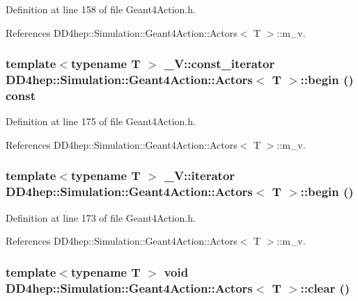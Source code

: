 Definition at line 158 of file Geant4Action.h.

References DD4hep::Simulation::Geant4Action::Actors$<$ T $>$::m\_\-v.\hypertarget{class_d_d4hep_1_1_simulation_1_1_geant4_action_1_1_actors_a6a4ddb5b54c6676c1f4856d331638a1d}{
\subsubsection[{begin}]{\setlength{\rightskip}{0pt plus 5cm}template$<$typename T $>$ \_\-V::const\_\-iterator {\bf DD4hep::Simulation::Geant4Action::Actors}$<$ {\bf T} $>$::begin () const}}
\label{class_d_d4hep_1_1_simulation_1_1_geant4_action_1_1_actors_a6a4ddb5b54c6676c1f4856d331638a1d}


Definition at line 175 of file Geant4Action.h.

References DD4hep::Simulation::Geant4Action::Actors$<$ T $>$::m\_\-v.\hypertarget{class_d_d4hep_1_1_simulation_1_1_geant4_action_1_1_actors_a400f8d564251e0bba5cdb1e35f58b72a}{
\subsubsection[{begin}]{\setlength{\rightskip}{0pt plus 5cm}template$<$typename T $>$ \_\-V::iterator {\bf DD4hep::Simulation::Geant4Action::Actors}$<$ {\bf T} $>$::begin ()}}
\label{class_d_d4hep_1_1_simulation_1_1_geant4_action_1_1_actors_a400f8d564251e0bba5cdb1e35f58b72a}


Definition at line 173 of file Geant4Action.h.

References DD4hep::Simulation::Geant4Action::Actors$<$ T $>$::m\_\-v.\hypertarget{class_d_d4hep_1_1_simulation_1_1_geant4_action_1_1_actors_a6f7c4daf69449e916f62cf5767041aa8}{
\subsubsection[{clear}]{\setlength{\rightskip}{0pt plus 5cm}template$<$typename T $>$ void {\bf DD4hep::Simulation::Geant4Action::Actors}$<$ {\bf T} $>$::clear ()}}
\label{class_d_d4hep_1_1_simulation_1_1_geant4_action_1_1_actors_a6f7c4daf69449e916f62cf5767041aa8}


